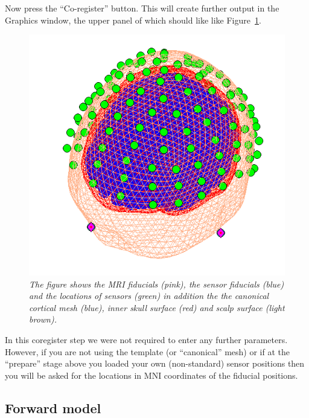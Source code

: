 Now press the ``Co-register'' button. This will create further output in the Graphics window, the upper panel of which should like like Figure~\ref{coreg}.
\begin{figure}
\begin{center}
\includegraphics[width=120mm]{mmn/coreg}
\caption{\em
The figure shows the MRI fiducials (pink), the sensor fiducials (blue) and the locations of sensors (green) in addition the the canonical cortical mesh (blue), inner skull surface (red) and scalp surface (light brown).
\label{coreg}}
\end{center}
\end{figure}

In this coregister step we were not required to enter any further parameters. However, if you are not using the template (or ``canonical'' mesh) or if at the ``prepare'' stage above you loaded your own (non-standard) sensor positions then you will be asked for the locations in MNI coordinates of the fiducial positions.

\subsection{Forward model}


